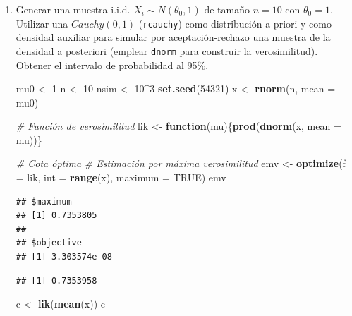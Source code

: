 \documentclass[]{book}
\newenvironment{Shaded}{\begin{snugshade}}{\end{snugshade}}
\newcommand{\KeywordTok}[1]{\textcolor[rgb]{0.13,0.29,0.53}{\textbf{#1}}}
\newcommand{\DataTypeTok}[1]{\textcolor[rgb]{0.13,0.29,0.53}{#1}}
\newcommand{\DecValTok}[1]{\textcolor[rgb]{0.00,0.00,0.81}{#1}}
\newcommand{\StringTok}[1]{\textcolor[rgb]{0.31,0.60,0.02}{#1}}
\newcommand{\CommentTok}[1]{\textcolor[rgb]{0.56,0.35,0.01}{\textit{#1}}}
\newcommand{\OtherTok}[1]{\textcolor[rgb]{0.56,0.35,0.01}{#1}}
\newcommand{\ControlFlowTok}[1]{\textcolor[rgb]{0.13,0.29,0.53}{\textbf{#1}}}
\newcommand{\OperatorTok}[1]{\textcolor[rgb]{0.81,0.36,0.00}{\textbf{#1}}}
\newcommand{\NormalTok}[1]{#1}
\theoremstyle{definition}
\theoremstyle{definition}
\theoremstyle{definition}
\theoremstyle{remark}
\begin{document}
\begin{enumerate}
\def\labelenumi{\alph{enumi})}
\item
  Generar una muestra i.i.d. \(X_{i}\sim N(\theta_{0},1)\) de tamaño
  \(n=10\) con \(\theta_{0}=1\). Utilizar una \(Cauchy(0,1)\)
  (\texttt{rcauchy}) como distribución a priori y como densidad auxiliar
  para simular por aceptación-rechazo una muestra de la densidad a
  posteriori (emplear \texttt{dnorm} para construir la verosimilitud).
  Obtener el intervalo de probabilidad al 95\%.

\begin{Shaded}
\begin{Highlighting}[]
\NormalTok{mu0 <-}\StringTok{ }\DecValTok{1}
\NormalTok{n <-}\StringTok{ }\DecValTok{10}
\NormalTok{nsim <-}\StringTok{ }\DecValTok{10}\OperatorTok{^}\DecValTok{3}
\KeywordTok{set.seed}\NormalTok{(}\DecValTok{54321}\NormalTok{)}
\NormalTok{x <-}\StringTok{ }\KeywordTok{rnorm}\NormalTok{(n, }\DataTypeTok{mean =}\NormalTok{ mu0)}

\CommentTok{# Función de verosimilitud}
\NormalTok{lik <-}\StringTok{ }\ControlFlowTok{function}\NormalTok{(mu)\{}\KeywordTok{prod}\NormalTok{(}\KeywordTok{dnorm}\NormalTok{(x, }\DataTypeTok{mean =}\NormalTok{ mu))\}}

\CommentTok{# Cota óptima}
\CommentTok{# Estimación por máxima verosimilitud}
\NormalTok{emv <-}\StringTok{ }\KeywordTok{optimize}\NormalTok{(}\DataTypeTok{f =}\NormalTok{ lik, }\DataTypeTok{int =} \KeywordTok{range}\NormalTok{(x), }\DataTypeTok{maximum =} \OtherTok{TRUE}\NormalTok{)}
\NormalTok{emv}
\end{Highlighting}
\end{Shaded}

\begin{verbatim}
## $maximum
## [1] 0.7353805
## 
## $objective
## [1] 3.303574e-08
\end{verbatim}

\begin{Shaded}
\end{Shaded}

\begin{verbatim}
## [1] 0.7353958
\end{verbatim}

\begin{Shaded}
\begin{Highlighting}[]
\NormalTok{c <-}\StringTok{ }\KeywordTok{lik}\NormalTok{(}\KeywordTok{mean}\NormalTok{(x))}
\NormalTok{c}
\end{Highlighting}
\end{Shaded}


\end{enumerate}
\end{document}

